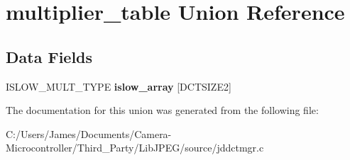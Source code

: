 \hypertarget{unionmultiplier__table}{}\section{multiplier\+\_\+table Union Reference}
\label{unionmultiplier__table}
\subsection*{Data Fields}
\begin{DoxyCompactItemize}
\item 
\mbox{\label{unionmultiplier__table_acc282c246df54adf7e65eb86950981be}} 
I\+S\+L\+O\+W\+\_\+\+M\+U\+L\+T\+\_\+\+T\+Y\+PE {\bfseries islow\+\_\+array} \mbox{[}D\+C\+T\+S\+I\+Z\+E2\mbox{]}
\end{DoxyCompactItemize}


The documentation for this union was generated from the following file\+:\begin{DoxyCompactItemize}
\item 
C\+:/\+Users/\+James/\+Documents/\+Camera-\/\+Microcontroller/\+Third\+\_\+\+Party/\+Lib\+J\+P\+E\+G/source/jddctmgr.\+c\end{DoxyCompactItemize}
